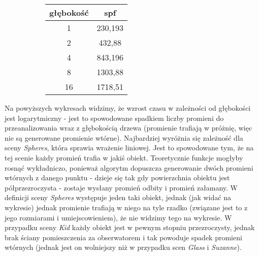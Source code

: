 \begin{figure}[!htb]
\advance\leftskip-2cm
\begin{subfigure}{.5\textwidth}
\end{subfigure}
\hspace{2cm}
\begin{subfigure}{.5\textwidth}
		\begin{longtable}{|c|c|} \hline
	    głębokość & spf \\ \hline
		1 & 230,193 \\
		2 & 432,88 \\
		4 & 843,196 \\ 
		8 & 1303,88 \\
		16 & 1718,51 \\
		\hline
		\end{longtable}
\end{subfigure}
\end{figure}

Na powyższych wykresach widzimy, że wzrost czasu w zależności od głębokości jest logarytmiczny - jest to spowodowane spadkiem liczby promieni do przeanalizowania wraz z głębokością drzewa (promienie trafiają w próżnię, więc nie są generowane promienie wtórne). Najbardziej wyróżnia się zależność dla sceny \emph{Spheres}, która sprawia wrażenie liniowej. Jest to spowodowane tym, że na tej scenie każdy promień trafia w jakiś obiekt. Teoretycznie funkcje mogłyby rosnąć wykładniczo, ponieważ algorytm dopuszcza generowanie dwóch promieni wtórnych z danego punktu - dzieje się tak gdy powierzchnia obiektu jest półprzezroczysta - zostaje wysłany promień odbity i promień załamany. W definicji sceny \emph{Spheres} występuje jeden taki obiekt, jednak (jak widać na wykresie) jednak promienie trafiają w niego na tyle rzadko (związane jest to z jego rozmiarami i umiejscowieniem), że nie widzimy tego na wykresie. W przypadku sceny \emph{Kid} każdy obiekt jest w pewnym stopniu przezroczysty, jednak brak ściany pomieszczenia za obserwatorem i tak powoduje spadek promieni wtórnych (jednak jest on wolniejszy niż w przypadku scen \emph{Glass} i \emph{Suzanne}).

